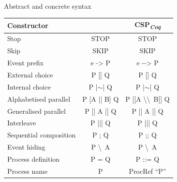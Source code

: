 \documentclass[t]{beamer}
\newcommand{\CSPcoq}{CSP\textsubscript{\textit{Coq}}}
\begin{document}
\begin{frame}{Abstract and concrete syntax}
	\begin{table}[htb]
		\scriptsize
		\begin{center}
			\begin{tabular}{ |l||c|c| }
				\hline
				\textbf{Constructor} & \textbf{\CSPM{}} & \textbf{\CSPcoq{}} \\
				\hline\hline
				Stop & STOP & STOP \\ [0.5ex]
				Skip & SKIP & SKIP \\ [0.5ex]
				Event prefix & e -> P & e -{}-> P \\  [0.5ex]
				External choice & P [] Q & P [] Q \\  [0.5ex]
				Internal choice & P |$ \sim $| Q & P |$ \sim $| Q \\ [0.5ex]
				Alphabetised parallel & P [A || B] Q & P [[A \textbackslash\textbackslash \ B]] Q \\ [0.5ex]
				Generalised parallel & P [| A |] Q & P [| A |] Q \\ [0.5ex]
				Interleave & P ||| Q & P ||| Q \\ [0.5ex]
				Sequential composition & P ; Q & P ;; Q \\ [0.5ex]
				Event hiding & P \textbackslash \ A & P \textbackslash \ A \\ [0.5ex]
				Process definition & P = Q & P ::= Q \\ [0.5ex]
				Process name & P & ProcRef ``P'' \\ [0.5ex]
				\hline
			\end{tabular}
		\end{center}
	\end{table}
\end{frame}
\end{document}
